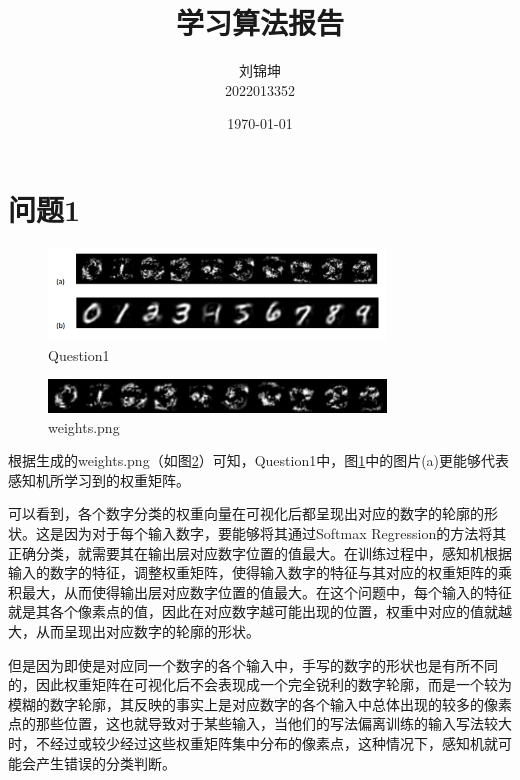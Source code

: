 \documentclass[UTF8]{ctexart}
\title{学习算法报告}
\author{
    刘锦坤
    \\2022013352}
\date{\today}
\begin{document}
\fancyfoot[C]{\thepage}

\maketitle
\tableofcontents

\section{问题1}

\begin{figure}[h]
    \centering
    \includegraphics[width=0.8\textwidth]{./image/ab.png}
    \caption{Question1}
    \label{fig:Question1}
\end{figure}

\begin{figure}[h]
    \centering
    \includegraphics[width=0.8\textwidth]{./image/weights.png}
    \caption{weights.png}
    \label{fig:weights}
\end{figure}

\indent 根据生成的weights.png（如图\ref{fig:weights}）可知，Question1中，图\ref{fig:Question1}中的图片(a)更能够代表感知机所学习到的权重矩阵。

\indent 可以看到，各个数字分类的权重向量在可视化后都呈现出对应的数字的轮廓的形状。这是因为对于每个输入数字，要能够将其通过Softmax Regression的方法将其正确分类，就需要其在输出层对应数字位置的值最大。在训练过程中，感知机根据输入的数字的特征，调整权重矩阵，使得输入数字的特征与其对应的权重矩阵的乘积最大，从而使得输出层对应数字位置的值最大。在这个问题中，每个输入的特征就是其各个像素点的值，因此在对应数字越可能出现的位置，权重中对应的值就越大，从而呈现出对应数字的轮廓的形状。

\indent 但是因为即使是对应同一个数字的各个输入中，手写的数字的形状也是有所不同的，因此权重矩阵在可视化后不会表现成一个完全锐利的数字轮廓，而是一个较为模糊的数字轮廓，其反映的事实上是对应数字的各个输入中总体出现的较多的像素点的那些位置，这也就导致对于某些输入，当他们的写法偏离训练的输入写法较大时，不经过或较少经过这些权重矩阵集中分布的像素点，这种情况下，感知机就可能会产生错误的分类判断。
\end{document}
